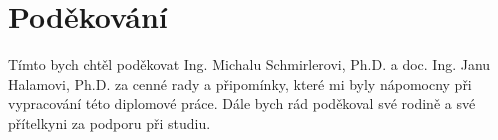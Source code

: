 \thispagestyle{empty}

\null

\vfill

\section*{Poděkování}
Tímto bych chtěl poděkovat Ing. Michalu Schmirlerovi, Ph.D. a doc. Ing. Janu Halamovi, Ph.D. za cenné rady a připomínky, které mi byly nápomocny při vypracování této diplomové práce. Dále bych rád poděkoval své rodině a své přítelkyni za podporu při studiu.